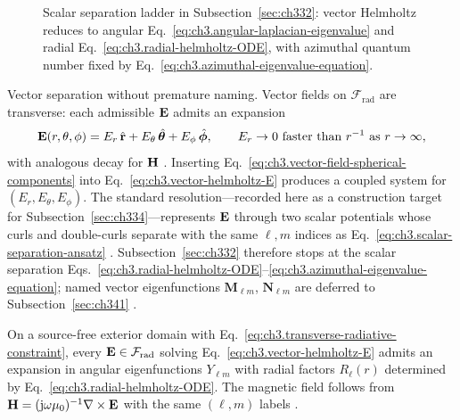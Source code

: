 \begin{figure}[t]
\centering
{}
\caption{Scalar separation ladder in Subsection~\ref{sec:ch332}: vector Helmholtz reduces to angular
Eq.~\eqref{eq:ch3.angular-laplacian-eigenvalue} and radial Eq.~\eqref{eq:ch3.radial-helmholtz-ODE}, with
azimuthal quantum number fixed by Eq.~\eqref{eq:ch3.azimuthal-eigenvalue-equation}.}
\label{fig:ch3.spherical-separation-ladder}
\end{figure}
Vector separation without premature naming. Vector fields on \(\mathcal{F}_{\mathrm{rad}}\) are transverse: each admissible \(\mathbf{E}\) admits an expansion
\begin{equation}
\label{eq:ch3.vector-field-spherical-components}
\mathbf{E}(r,\theta,\phi)
=
E_{r}\,\hat{\mathbf{r}}+E_{\theta}\,\hat{\boldsymbol{\theta}}+E_{\phi}\,\hat{\boldsymbol{\phi}},
\qquad
E_{r}\to0\ \text{faster than }r^{-1}\ \text{as }r\to\infty,
\end{equation}
with analogous decay for \(\mathbf{H}\) \cite{stratton1941}. Inserting
Eq.~\eqref{eq:ch3.vector-field-spherical-components} into Eq.~\eqref{eq:ch3.vector-helmholtz-E} produces a
coupled system for \((E_{r},E_{\theta},E_{\phi})\). The standard resolution---recorded here as a construction
target for Subsection~\ref{sec:ch334}---represents \(\mathbf{E}\) through two scalar potentials whose curls and
double-curls separate with the same \(\ell,m\) indices as Eq.~\eqref{eq:ch3.scalar-separation-ansatz}
\cite{stratton1941}. Subsection~\ref{sec:ch332} therefore stops at the scalar separation
Eqs.~\eqref{eq:ch3.radial-helmholtz-ODE}--\eqref{eq:ch3.azimuthal-eigenvalue-equation}; named vector
eigenfunctions \(\mathbf{M}_{\ell m}\), \(\mathbf{N}_{\ell m}\) are deferred to Subsection~\ref{sec:ch341}
\cite{hansen1988}.
\begin{theorem}
\label{thm:ch3.vector-separability}
On a source-free exterior domain with Eq.~\eqref{eq:ch3.transverse-radiative-constraint}, every
\(\mathbf{E}\in\mathcal{F}_{\mathrm{rad}}\) solving Eq.~\eqref{eq:ch3.vector-helmholtz-E} admits an expansion in
angular eigenfunctions \(Y_{\ell m}\) with radial factors \(R_{\ell}(r)\) determined by
Eq.~\eqref{eq:ch3.radial-helmholtz-ODE}. The magnetic field follows from
\(\mathbf{H}=(\mathrm{j}\omega\mu_{0})^{-1}\nabla\times\mathbf{E}\) with the same \((\ell,m)\) labels \cite{stratton1941}.
\end{theorem}
